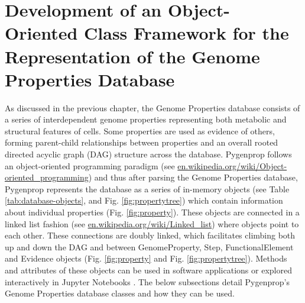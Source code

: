 \section{Development of an Object-Oriented Class Framework for the Representation of the Genome Properties Database}

As discussed in the previous chapter, the Genome Properties database consists of a series of interdependent genome properties representing both metabolic and structural features of cells. Some properties are used as evidence of others, forming parent-child relationships between properties and an overall rooted directed acyclic graph (DAG) structure across the database. Pygenprop follows an object-oriented programming paradigm \cite{booch1986object} (see \href{en.wikipedia.org/wiki/Object-oriented\_programming}{en.wikipedia.org/wiki/Object-oriented\_programming}) and thus after parsing the Genome Properties database, Pygenprop represents the database as a series of in-memory objects (see Table \ref{tab:database-objects}, and Fig. \ref{fig:propertytree}) which contain information about individual properties (Fig. \ref{fig:property}). These objects are connected in a linked list fashion \cite{newell1957programming} (see \href{en.wikipedia.org/wiki/Linked\_list}{en.wikipedia.org/wiki/Linked\_list}) where objects point to each other. These connections are doubly linked, which facilitates climbing both up and down the DAG and between GenomeProperty, Step, FunctionalElement and Evidence objects (Fig. \ref{fig:property} and Fig. \ref{fig:propertytree}). Methods and attributes of these objects can be used in software applications or explored interactively in Jupyter Notebooks \cite{kluyver2016jupyter}. The below subsections detail Pygenprop's Genome Properties database classes and how they can be used. 


